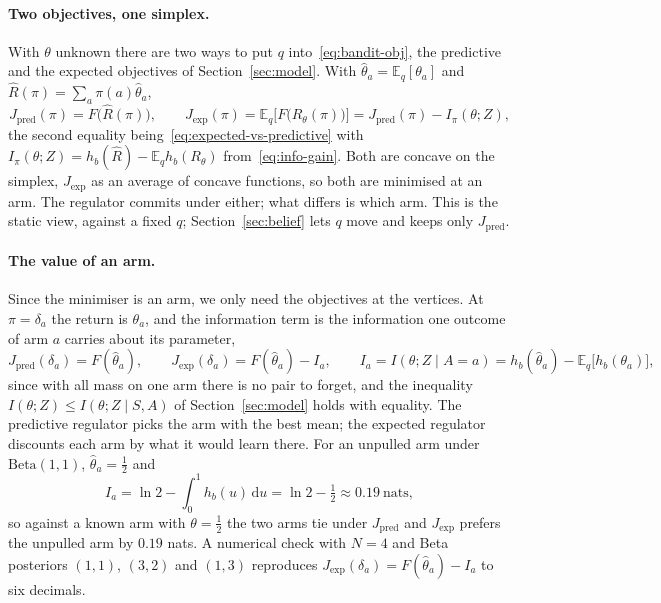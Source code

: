 \documentclass[11pt]{article}
\theoremstyle{remark}
\newcommand{\E}{\mathbb E}
\newcommand{\1}{\mathds{1}}
\newcommand{\dd}{\mathrm d}
\begin{document}
\paragraph{Two objectives, one simplex.}
With $\theta$ unknown there are two ways to put $q$ into~\eqref{eq:bandit-obj}, the predictive and the expected objectives of Section~\ref{sec:model}.
With $\hat\theta_a=\E_q[\theta_a]$ and $\hat R(\pi)=\sum_a\pi(a)\hat\theta_a$,
\begin{equation}
  J_{\mathrm{pred}}(\pi)=F\big(\hat R(\pi)\big),
  \qquad
  J_{\mathrm{exp}}(\pi)=\E_q\Big[F\big(R_\theta(\pi)\big)\Big]
  =J_{\mathrm{pred}}(\pi)-I_\pi(\theta;Z),
  \label{eq:bandit-two}
\end{equation}
the second equality being~\eqref{eq:expected-vs-predictive} with $I_\pi(\theta;Z)=h_b(\hat R)-\E_q h_b(R_\theta)$ from~\eqref{eq:info-gain}.
Both are concave on the simplex, $J_{\mathrm{exp}}$ as an average of concave functions, so both are minimised at an arm.
The regulator commits under either; what differs is which arm.
This is the static view, against a fixed $q$; Section~\ref{sec:belief} lets $q$ move and keeps only $J_{\mathrm{pred}}$.

\paragraph{The value of an arm.}
Since the minimiser is an arm, we only need the objectives at the vertices.
At $\pi=\delta_a$ the return is $\theta_a$, and the information term is the information one outcome of arm $a$ carries about its parameter,
\begin{equation}
  J_{\mathrm{pred}}(\delta_a)=F(\hat\theta_a),
  \qquad
  J_{\mathrm{exp}}(\delta_a)=F(\hat\theta_a)-I_a,
  \qquad
  I_a=I(\theta;Z\mid A=a)=h_b(\hat\theta_a)-\E_q\big[h_b(\theta_a)\big],
  \label{eq:arm-value}
\end{equation}
since with all mass on one arm there is no pair to forget, and the inequality $I(\theta;Z)\le I(\theta;Z\mid S,A)$ of Section~\ref{sec:model} holds with equality.
The predictive regulator picks the arm with the best mean; the expected regulator discounts each arm by what it would learn there.
For an unpulled arm under $\mathrm{Beta}(1,1)$, $\hat\theta_a=\tfrac12$ and
\begin{equation}
  I_a=\ln2-\int_0^1h_b(u)\,\dd u=\ln2-\tfrac12\approx0.19\ \text{nats},
\end{equation}
so against a known arm with $\theta=\tfrac12$ the two arms tie under $J_{\mathrm{pred}}$ and $J_{\mathrm{exp}}$ prefers the unpulled arm by $0.19$ nats.
A numerical check with $N=4$ and Beta posteriors $(1,1)$, $(3,2)$ and $(1,3)$ reproduces $J_{\mathrm{exp}}(\delta_a)=F(\hat\theta_a)-I_a$ to six decimals.
\end{document}
